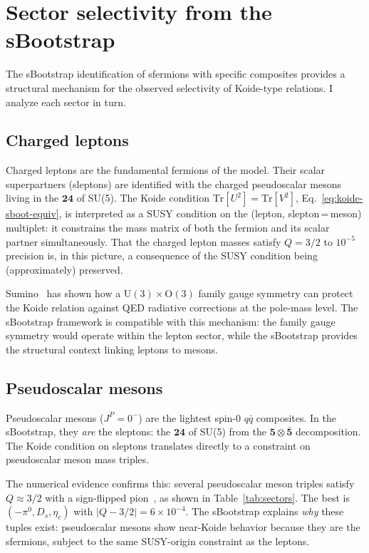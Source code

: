 \documentclass[prd,twocolumn,superscriptaddress,nofootinbib]{revtex4-2}
\newcommand{\Tr}{\mathrm{Tr}}
\begin{document}
\section{Sector selectivity from the sBootstrap}
\label{sec:selectivity}

The sBootstrap identification of sfermions with specific composites
provides a structural mechanism for the observed selectivity of
Koide-type relations.  I analyze each sector in turn.

\subsection{Charged leptons}
\label{sec:leptons}

Charged leptons are the fundamental fermions of the model.  Their
scalar superpartners (sleptons) are identified with the charged
pseudoscalar mesons living in the $\mathbf{24}$ of SU(5).  The Koide
condition $\Tr[U^2]=\Tr[V^2]$, Eq.~\eqref{eq:koide-sboot-equiv}, is
interpreted as a SUSY condition on the (lepton, slepton\,=\,meson)
multiplet: it constrains the mass matrix of both the fermion and its
scalar partner simultaneously.  That the charged lepton masses satisfy
$Q=3/2$ to $10^{-5}$ precision is, in this picture, a consequence of the
SUSY condition being (approximately) preserved.

Sumino~\cite{Sumino2009} has shown how a $\text{U}(3)\times\text{O}(3)$
family gauge symmetry can protect the Koide relation against QED
radiative corrections at the pole-mass level.  The sBootstrap framework
is compatible with this mechanism: the family gauge symmetry would
operate within the lepton sector, while the sBootstrap provides the
structural context linking leptons to mesons.

\subsection{Pseudoscalar mesons}
\label{sec:pseudoscalars}

Pseudoscalar mesons ($J^P=0^-$) are the lightest spin-0 $q\bar{q}$
composites.  In the sBootstrap, they \emph{are} the sleptons: the
$\mathbf{24}$ of SU(5) from the $\mathbf{5}\otimes\bar{\mathbf{5}}$
decomposition.  The Koide condition on sleptons translates directly to a
constraint on pseudoscalar meson mass triples.

The numerical evidence confirms this: several pseudoscalar meson triples
satisfy $Q\approx 3/2$ with a sign-flipped pion~\cite{Rivero2007spectroscopy},
as shown in Table~\ref{tab:sectors}.
The best is $(-\pi^0,D_s,\eta_c)$ with $|Q-3/2|=6\times 10^{-4}$.
The sBootstrap explains \emph{why} these tuples exist:
pseudoscalar mesons show near-Koide behavior because they are the
sfermions, subject to the same SUSY-origin constraint as the leptons.
\end{document}
